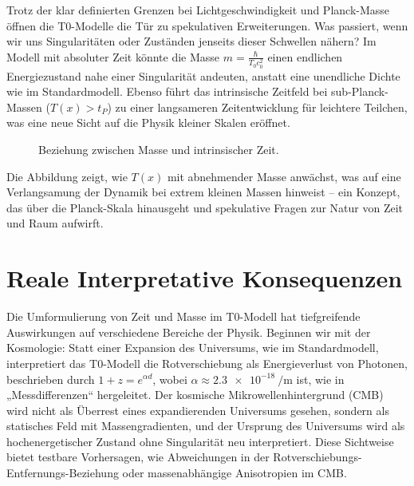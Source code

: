 \documentclass[a4paper,12pt]{article}
\newcommand{\Tfield}{T(x)}
\begin{document}
	Trotz der klar definierten Grenzen bei Lichtgeschwindigkeit und Planck-Masse öffnen die T0-Modelle die Tür zu spekulativen Erweiterungen. Was passiert, wenn wir uns Singularitäten oder Zuständen jenseits dieser Schwellen nähern? Im Modell mit absoluter Zeit könnte die Masse \(m = \frac{\hbar}{T_0 c_0^2}\) einen endlichen Energiezustand nahe einer Singularität andeuten, anstatt eine unendliche Dichte wie im Standardmodell. Ebenso führt das intrinsische Zeitfeld bei sub-Planck-Massen (\(\Tfield > t_P\)) zu einer langsameren Zeitentwicklung für leichtere Teilchen, was eine neue Sicht auf die Physik kleiner Skalen eröffnet.
	
	\begin{figure}[h]
		\centering
		\caption{Beziehung zwischen Masse und intrinsischer Zeit.}
	\end{figure}
	
	Die Abbildung zeigt, wie \(\Tfield\) mit abnehmender Masse anwächst, was auf eine Verlangsamung der Dynamik bei extrem kleinen Massen hinweist – ein Konzept, das über die Planck-Skala hinausgeht und spekulative Fragen zur Natur von Zeit und Raum aufwirft.
	
	\section{Reale Interpretative Konsequenzen}
	
	Die Umformulierung von Zeit und Masse im T0-Modell hat tiefgreifende Auswirkungen auf verschiedene Bereiche der Physik. Beginnen wir mit der Kosmologie: Statt einer Expansion des Universums, wie im Standardmodell, interpretiert das T0-Modell die Rotverschiebung als Energieverlust von Photonen, beschrieben durch \(1 + z = e^{\alpha d}\), wobei \(\alpha \approx \SI{2.3e-18}{\per\meter}\) ist, wie in „Messdifferenzen“ \cite{pascher_messdifferenzen_2025} hergeleitet. Der kosmische Mikrowellenhintergrund (CMB) wird nicht als Überrest eines expandierenden Universums gesehen, sondern als statisches Feld mit Massengradienten, und der Ursprung des Universums wird als hochenergetischer Zustand ohne Singularität neu interpretiert. Diese Sichtweise bietet testbare Vorhersagen, wie Abweichungen in der Rotverschiebungs-Entfernungs-Beziehung oder massenabhängige Anisotropien im CMB.
	
\end{document}
